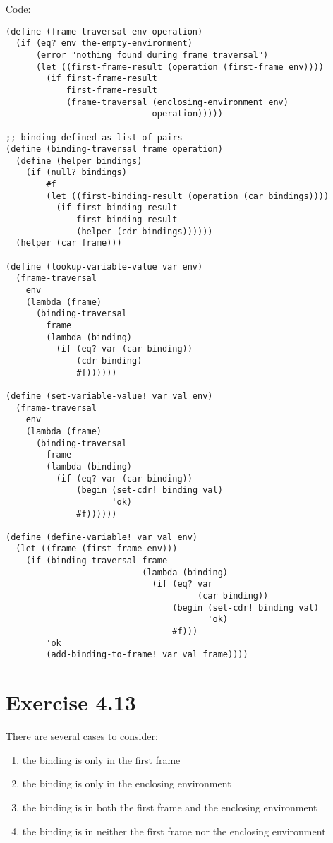 \documentclass[../main.tex]{subfiles}
\begin{document}
Code:

\begin{lstlisting}
(define (frame-traversal env operation)
  (if (eq? env the-empty-environment)
      (error "nothing found during frame traversal")
      (let ((first-frame-result (operation (first-frame env))))
        (if first-frame-result
            first-frame-result
            (frame-traversal (enclosing-environment env)
                             operation)))))

;; binding defined as list of pairs
(define (binding-traversal frame operation)
  (define (helper bindings)
    (if (null? bindings)
        #f
        (let ((first-binding-result (operation (car bindings))))
          (if first-binding-result
              first-binding-result
              (helper (cdr bindings))))))
  (helper (car frame)))

(define (lookup-variable-value var env)
  (frame-traversal
    env
    (lambda (frame)
      (binding-traversal
        frame
        (lambda (binding)
          (if (eq? var (car binding))
              (cdr binding)
              #f))))))

(define (set-variable-value! var val env)
  (frame-traversal
    env
    (lambda (frame)
      (binding-traversal
        frame
        (lambda (binding)
          (if (eq? var (car binding))
              (begin (set-cdr! binding val)
                     'ok)
              #f))))))

(define (define-variable! var val env)
  (let ((frame (first-frame env)))
    (if (binding-traversal frame
                           (lambda (binding)
                             (if (eq? var
                                      (car binding))
                                 (begin (set-cdr! binding val)
                                        'ok)
                                 #f)))
        'ok
        (add-binding-to-frame! var val frame))))
\end{lstlisting}

\section{Exercise 4.13}

There are several cases to consider:

\begin{enumerate}
\item the binding is only in the first frame
\item the binding is only in the enclosing environment
\item the binding is in both the first frame and the enclosing environment
\item the binding is in neither the first frame nor the enclosing
environment
\end{enumerate}
\end{document}
